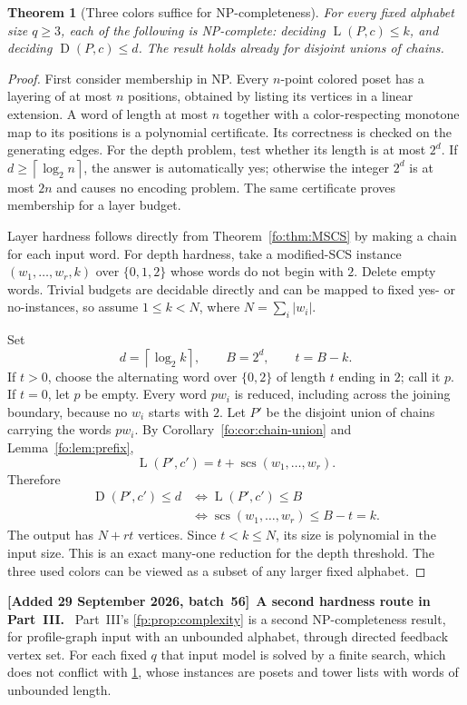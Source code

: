 \documentclass[11pt,letterpaper]{article}
\numberwithin{equation}{section}
\newtheorem{theorem}{Theorem}[section]
\theoremstyle{definition}
\theoremstyle{remark}
\theoremstyle{definition}
\newcommand{\ceil}[1]{\left\lceil#1\right\rceil}
\newcommand{\scs}{\operatorname{scs}}
\newcommand{\depth}{\operatorname{D}}
\newcommand{\layers}{\operatorname{L}}
\newcommand{\len}[1]{\lvert #1\rvert}
\newenvironment{writenotec}[1][]{\par\smallskip\begingroup\small\sloppy
 \noindent\textbf{[Added 29 September 2026, batch~56]}\if\relax\detokenize{#1}\relax\else~\textbf{#1.}\fi\ }%
 {\par\endgroup\smallskip}
\begin{document}
\begin{theorem}[Three colors suffice for NP-completeness]
\label{fo:thm:NP}
For every fixed alphabet size $q\ge3$, each of the following is NP-complete:
deciding $\layers(P,c)\le k$, and deciding $\depth(P,c)\le d$.
The result holds already for disjoint unions of chains.
\end{theorem}

\begin{proof}
First consider membership in NP. Every $n$-point colored poset has a layering
of at most $n$ positions, obtained by listing its vertices in a linear
extension. A word of length at most $n$ together with a color-respecting
monotone map to its positions is a polynomial certificate. Its correctness is
checked on the generating edges. For the depth problem, test whether its length
is at most $2^d$. If $d\ge\ceil{\log_2n}$, the answer is automatically yes;
otherwise the integer $2^d$ is at most $2n$ and causes no encoding problem.
The same certificate proves membership for a layer budget.

Layer hardness follows directly from Theorem~\ref{fo:thm:MSCS} by making a chain
for each input word. For depth hardness, take a modified-SCS instance
$(w_1,\ldots,w_r,k)$ over $\{0,1,2\}$ whose words do not begin with $2$.
Delete empty words. Trivial budgets are decidable directly and can be mapped
to fixed yes- or no-instances, so assume $1\le k<N$, where
$N=\sum_i\len{w_i}$.

Set
\[
 d=\ceil{\log_2k},\qquad B=2^d,\qquad t=B-k.
\]
If $t>0$, choose the alternating word over $\{0,2\}$ of length $t$ ending in
$2$; call it $p$. If $t=0$, let $p$ be empty. Every word $pw_i$ is reduced,
including across the joining boundary, because no $w_i$ starts with $2$.
Let $P'$ be the disjoint union of chains carrying the words $pw_i$. By
Corollary~\ref{fo:cor:chain-union} and Lemma~\ref{fo:lem:prefix},
\[
 \layers(P',c')=t+\scs(w_1,\ldots,w_r).
\]
Therefore
\begin{align*}
 \depth(P',c')\le d
 &\Longleftrightarrow \layers(P',c')\le B\\
 &\Longleftrightarrow \scs(w_1,\ldots,w_r)\le B-t=k.
\end{align*}
The output has $N+rt$ vertices. Since $t<k\le N$, its size is polynomial in
the input size. This is an exact many-one reduction for the depth threshold.
The three used colors can be viewed as a subset of any larger fixed alphabet.
\end{proof}

\begin{writenotec}[A second hardness route in Part~III]
Part~III's \cref{fp:prop:complexity} is a second NP-completeness result, for
profile-graph input with an unbounded alphabet, through directed feedback
vertex set. For each fixed $q$ that input model is solved by a finite search,
which does not conflict with \cref{fo:thm:NP}, whose instances are posets and
tower lists with words of unbounded length.
\end{writenotec}
\end{document}

